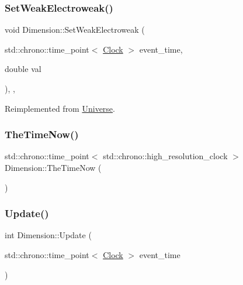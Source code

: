 \subsubsection{\texorpdfstring{Set\+Weak\+Electroweak()}{SetWeakElectroweak()}}
{\footnotesize\ttfamily void Dimension\+::\+Set\+Weak\+Electroweak (\begin{DoxyParamCaption}\item[{std\+::chrono\+::time\+\_\+point$<$ \mbox{\hyperlink{universe_8h_a0ef8d951d1ca5ab3cfaf7ab4c7a6fd80}{Clock}} $>$}]{event\+\_\+time,  }\item[{double}]{val }\end{DoxyParamCaption})\hspace{0.3cm}{\ttfamily [inline]}, {\ttfamily [final]}, {\ttfamily [virtual]}}



Reimplemented from \mbox{\hyperlink{classUniverse_a2d3d642bfdc863248e93535832fa4b00}{Universe}}.

\mbox{\label{classDimension_ab39b7ff253ade59c5c2d807c511b4028}} 
\subsubsection{\texorpdfstring{The\+Time\+Now()}{TheTimeNow()}}
{\footnotesize\ttfamily std\+::chrono\+::time\+\_\+point$<$ std\+::chrono\+::high\+\_\+resolution\+\_\+clock $>$ Dimension\+::\+The\+Time\+Now (\begin{DoxyParamCaption}{ }\end{DoxyParamCaption})}

\mbox{\label{classDimension_a663916c2573b6df4db02ccee5678a75d}} 
\subsubsection{\texorpdfstring{Update()}{Update()}}
{\footnotesize\ttfamily int Dimension\+::\+Update (\begin{DoxyParamCaption}\item[{std\+::chrono\+::time\+\_\+point$<$ \mbox{\hyperlink{universe_8h_a0ef8d951d1ca5ab3cfaf7ab4c7a6fd80}{Clock}} $>$}]{event\+\_\+time }\end{DoxyParamCaption})}



